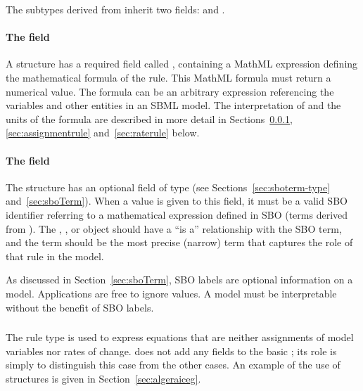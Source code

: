 The subtypes derived from \Rule inherit two fields: 
and .


\paragraph{The  field}

A \Rule structure has a required field called ,
containing a MathML expression defining the mathematical formula
of the rule.  This MathML formula must return a numerical value.
The formula can be an arbitrary expression referencing the
variables and other entities in an SBML model.  The interpretation
of  and the units of the formula are described in more
detail in Sections~\ref{sec:algebraicrule},
\ref{sec:assignmentrule} and~\ref{sec:raterule} below.


\paragraph{The  field}

The \Rule structure has an optional  field of type
 (see Sections~\ref{sec:sboterm-type}
and~\ref{sec:sboTerm}).  When a value is given to this field, it
must be a valid SBO identifier referring to a mathematical
expression defined in SBO (\ie terms derived from
\sbomathformula).  The \AlgebraicRule, \AssignmentRule, or
\RateRule object should have a ``is a'' relationship with the SBO
term, and the term should be the most precise (narrow) term that
captures the role of that rule in the model.

As discussed in Section~\ref{sec:sboTerm}, SBO labels are optional
information on a model.  Applications are free to ignore
 values.  A model must be interpretable without the
benefit of SBO labels.


\subsubsection{}
\label{sec:algebraicrule}

The rule type \AlgebraicRule is used to express equations that are
neither assignments of model variables nor rates of change.
\AlgebraicRule does not add any fields to the basic \Rule; its
role is simply to distinguish this case from the other cases.  An
example of the use of \AlgebraicRule structures is given in
Section~\ref{sec:algeraiceg}.

